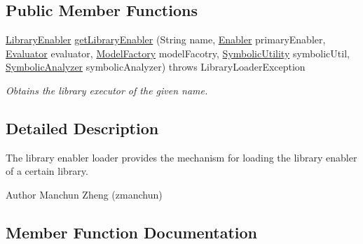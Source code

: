 \subsection*{Public Member Functions}
\begin{DoxyCompactItemize}
\item 
\hyperlink{interfaceedu_1_1udel_1_1cis_1_1vsl_1_1civl_1_1kripke_1_1IF_1_1LibraryEnabler}{Library\+Enabler} \hyperlink{interfaceedu_1_1udel_1_1cis_1_1vsl_1_1civl_1_1kripke_1_1IF_1_1LibraryEnablerLoader_a4a577b2f75edc5a86f2774e13400be43}{get\+Library\+Enabler} (String name, \hyperlink{interfaceedu_1_1udel_1_1cis_1_1vsl_1_1civl_1_1kripke_1_1IF_1_1Enabler}{Enabler} primary\+Enabler, \hyperlink{interfaceedu_1_1udel_1_1cis_1_1vsl_1_1civl_1_1semantics_1_1IF_1_1Evaluator}{Evaluator} evaluator, \hyperlink{interfaceedu_1_1udel_1_1cis_1_1vsl_1_1civl_1_1model_1_1IF_1_1ModelFactory}{Model\+Factory} model\+Facotry, \hyperlink{interfaceedu_1_1udel_1_1cis_1_1vsl_1_1civl_1_1dynamic_1_1IF_1_1SymbolicUtility}{Symbolic\+Utility} symbolic\+Util, \hyperlink{interfaceedu_1_1udel_1_1cis_1_1vsl_1_1civl_1_1semantics_1_1IF_1_1SymbolicAnalyzer}{Symbolic\+Analyzer} symbolic\+Analyzer)  throws Library\+Loader\+Exception
\begin{DoxyCompactList}\small\item\em Obtains the library executor of the given name. \end{DoxyCompactList}\end{DoxyCompactItemize}


\subsection{Detailed Description}
The library enabler loader provides the mechanism for loading the library enabler of a certain library. 

\begin{DoxyAuthor}{Author}
Manchun Zheng (zmanchun) 
\end{DoxyAuthor}


\subsection{Member Function Documentation}
\hypertarget{interfaceedu_1_1udel_1_1cis_1_1vsl_1_1civl_1_1kripke_1_1IF_1_1LibraryEnablerLoader_a4a577b2f75edc5a86f2774e13400be43}{}

